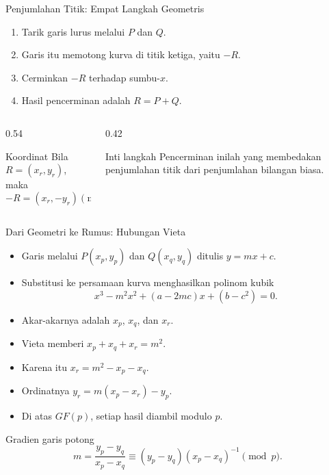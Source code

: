 \documentclass[aspectratio=169,11pt]{beamer}
\begin{document}
\begin{frame}{Penjumlahan Titik: Empat Langkah Geometris}
    \begin{enumerate}
        \item Tarik garis lurus melalui $P$ dan $Q$.
        \item Garis itu memotong kurva di titik ketiga, yaitu $-R$.
        \item Cerminkan $-R$ terhadap sumbu-$x$.
        \item Hasil pencerminan adalah $R = P + Q$.
    \end{enumerate}
    \vspace{0.15cm}
    \begin{columns}[T,onlytextwidth]
        \begin{column}{0.54\textwidth}
            \begin{block}{Koordinat}
                Bila $R=(x_r,y_r)$, maka
                \[
                    -R = (x_r,-y_r) \pmod p .
                \]
            \end{block}
        \end{column}
        \begin{column}{0.42\textwidth}
            \begin{alertblock}{Inti langkah}
                \footnotesize
                Pencerminan inilah yang membedakan penjumlahan titik dari
                penjumlahan bilangan biasa.
            \end{alertblock}
        \end{column}
    \end{columns}
\end{frame}

\begin{frame}{Dari Geometri ke Rumus: Hubungan Vieta}
    \footnotesize
    \begin{itemize}
        \item Garis melalui $P(x_p,y_p)$ dan $Q(x_q,y_q)$ ditulis
              $y = mx + c$.
        \item Substitusi ke persamaan kurva menghasilkan polinom kubik
              \[
                  x^3 - m^2x^2 + (a-2mc)x + (b-c^2) = 0 .
              \]
        \item Akar-akarnya adalah $x_p$, $x_q$, dan $x_r$.
        \item Vieta memberi $x_p + x_q + x_r = m^2$.
        \item Karena itu
              $x_r = m^2 - x_p - x_q$.
        \item Ordinatnya $y_r = m(x_p - x_r) - y_p$.
        \item Di atas $GF(p)$, setiap hasil diambil modulo $p$.
    \end{itemize}
    \begin{exampleblock}{Gradien garis potong}
        \[
            m = \frac{y_p - y_q}{x_p - x_q}
              \equiv (y_p - y_q)(x_p - x_q)^{-1} \pmod p .
        \]
    \end{exampleblock}
\end{frame}
\end{document}
